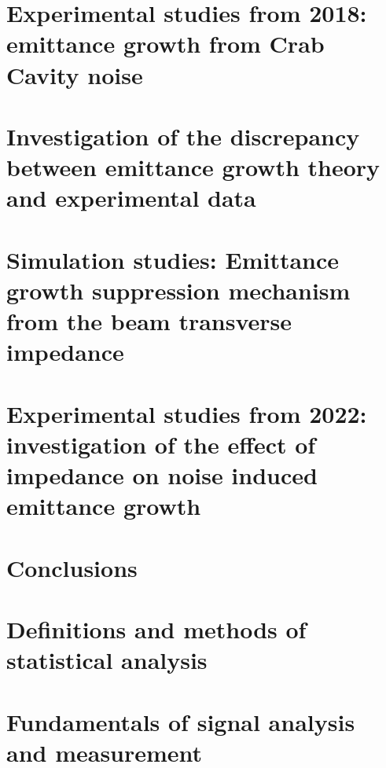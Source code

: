 \documentclass[12pt,twoside]{report} %
\begin{document}
\chapter{Experimental studies from 2018: emittance growth from Crab Cavity noise}\label{Ch:2018_analyisis}


%

\chapter{Investigation of the discrepancy between emittance growth theory and experimental data}\label{Ch:investigating_discrepancy}


\chapter{Simulation studies: Emittance growth suppression mechanism from the beam transverse impedance}\label{Ch:suppression_impedances}\label{Ch:suppression_impedance}


\chapter{Experimental studies from 2022: investigation of the effect of impedance on noise induced emittance growth}\label{Ch:experimental_CC_2022}


\chapter{Conclusions}\label{Ch:conclusions}


\appendix
\chapter{Definitions and  methods of statistical analysis}\label{ch:app_A}

\chapter{Fundamentals of signal analysis and measurement}\label{ch:app_B}

\end{document}
